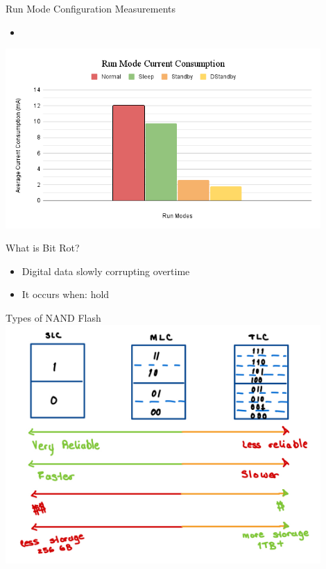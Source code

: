 \begin{frame}{Run Mode Configuration Measurements}
    \begin{itemize}
        \item 
    \end{itemize}
    \includegraphics[height=0.5\textheight,width=0.9\textwidth,keepaspectratio]{images/run_modes.png}
\end{frame}

\begin{frame}{What is Bit Rot?}
    \begin{itemize}
        \item Digital data slowly corrupting overtime
        \item It occurs when: hold
    \end{itemize}
    \centering
\end{frame}

\begin{frame}{Types of NAND Flash}
    \centering
    \includegraphics[height=0.9\textheight,width=0.9\textwidth,keepaspectratio]{images/flash_types.png}
\end{frame}

